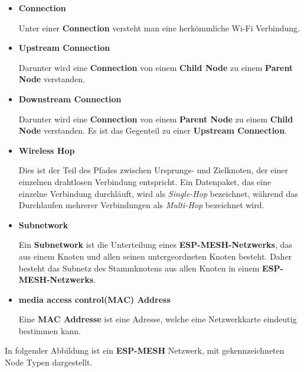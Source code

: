 \begin{itemize}
    \item \textbf{Connection}
    
    Unter einer \textbf{Connection} versteht man eine herkömmliche Wi-Fi Verbindung.

    \pagebreak
    \item \textbf{Upstream Connection}
    
    Darunter wird eine \textbf{Connection} von einem \textbf{Child Node} zu einem \textbf{Parent Node} verstanden.

    \item \textbf{Downstream Connection}
    
    Darunter wird eine \textbf{Connection} von einem \textbf{Parent Node} zu einem \textbf{Child Node} verstanden. Es ist das Gegenteil zu einer \textbf{Upstream Connection}.

    \item \textbf{Wireless Hop}
    
    Dies ist der Teil des Pfades zwischen Ursprungs- und Zielknoten, der einer einzelnen drahtlosen Verbindung entspricht. Ein Datenpaket, das eine einzelne Verbindung durchläuft, wird als \textit{Single-Hop} bezeichnet, während das Durchlaufen mehrerer Verbindungen als \textit{Multi-Hop} bezeichnet wird.
    
    \item \textbf{Subnetwork}
    
    Ein \textbf{Subnetwork} ist die Unterteilung eines \textbf{ESP-MESH-Netzwerks}, das aus einem Knoten und allen seinen untergeordneten Knoten besteht. Daher besteht das Subnetz des Stammknotens aus allen Knoten in einem \textbf{ESP-MESH-Netzwerks}.

    \item \textbf{media access control(MAC) Address}
    
    Eine \textbf{MAC Addresse} ist eine Adresse, welche eine Netzwerkkarte eindeutig bestimmen kann.
\end{itemize}

In folgender Abbildung ist ein \textbf{ESP-MESH} Netzwerk, mit gekennzeichneten Node Typen dargestellt.


